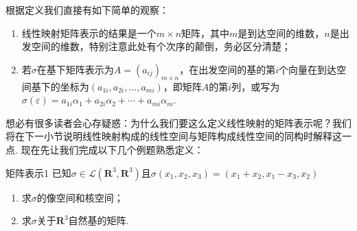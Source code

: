 根据定义我们直接有如下简单的观察：
\begin{enumerate}
    \item 线性映射矩阵表示的结果是一个$m\times n$矩阵，其中$m$是到达空间的维数，$n$是出发空间的维数，特别注意此处有个次序的颠倒，务必区分清楚；

    \item 若$\sigma$在基下矩阵表示为$A=(a_{ij})_{m\times n}$，在出发空间的基的第$i$个向量在到达空间基下的坐标为$(a_{1i},a_{2i},\ldots,a_{mi})$，即矩阵$A$的第$i$列，或写为$\sigma(\varepsilon)=a_{1i}\alpha_1+a_{2i}\alpha_2+\cdots+a_{mi}\alpha_m$.
\end{enumerate}

想必有很多读者会心存疑惑：为什么我们要这么定义线性映射的矩阵表示呢？我们将在下一小节说明线性映射构成的线性空间与矩阵构成线性空间的同构时解释这一点. 现在先让我们完成以下几个例题熟悉定义：
\begin{example}{}{矩阵表示1}
    已知$\sigma \in \mathcal{L}(\mathbf{R}^3,\mathbf{R}^3)$且$\sigma(x_1,x_2,x_3)=(x_1+x_2,x_1-x_3, x_2)$
    \begin{enumerate}
        \item 求$\sigma$的像空间和核空间；

        \item 求$\sigma$关于$\mathbf{R}^3$自然基的矩阵.
    \end{enumerate}
\end{example}

